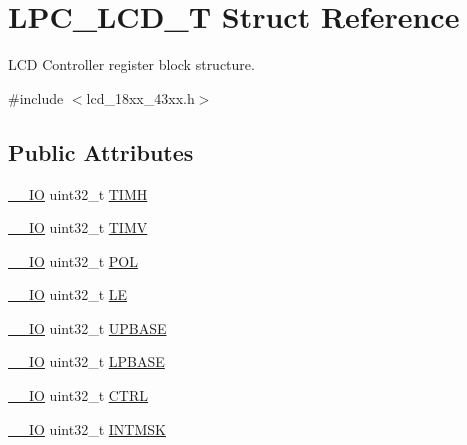\hypertarget{struct_l_p_c___l_c_d___t}{}\section{L\+P\+C\+\_\+\+L\+C\+D\+\_\+T Struct Reference}
\label{struct_l_p_c___l_c_d___t}


L\+CD Controller register block structure.  




{\ttfamily \#include $<$lcd\+\_\+18xx\+\_\+43xx.\+h$>$}

\subsection*{Public Attributes}
\begin{DoxyCompactItemize}
\item 
\hyperlink{core__sc300_8h_aec43007d9998a0a0e01faede4133d6be}{\+\_\+\+\_\+\+IO} uint32\+\_\+t \hyperlink{struct_l_p_c___l_c_d___t_a194e31abcb5374333f7e8346a5a7a3da}{T\+I\+MH}
\item 
\hyperlink{core__sc300_8h_aec43007d9998a0a0e01faede4133d6be}{\+\_\+\+\_\+\+IO} uint32\+\_\+t \hyperlink{struct_l_p_c___l_c_d___t_a01422d09a1ceb2784cdddd12c2b78cfc}{T\+I\+MV}
\item 
\hyperlink{core__sc300_8h_aec43007d9998a0a0e01faede4133d6be}{\+\_\+\+\_\+\+IO} uint32\+\_\+t \hyperlink{struct_l_p_c___l_c_d___t_a8674d4394f14a657cbc37e8cbea49c1d}{P\+OL}
\item 
\hyperlink{core__sc300_8h_aec43007d9998a0a0e01faede4133d6be}{\+\_\+\+\_\+\+IO} uint32\+\_\+t \hyperlink{struct_l_p_c___l_c_d___t_a5aac26c848401f1f369d7bf65c428036}{LE}
\item 
\hyperlink{core__sc300_8h_aec43007d9998a0a0e01faede4133d6be}{\+\_\+\+\_\+\+IO} uint32\+\_\+t \hyperlink{struct_l_p_c___l_c_d___t_a4df506e185ae165500576e5aeca11df3}{U\+P\+B\+A\+SE}
\item 
\hyperlink{core__sc300_8h_aec43007d9998a0a0e01faede4133d6be}{\+\_\+\+\_\+\+IO} uint32\+\_\+t \hyperlink{struct_l_p_c___l_c_d___t_ac954f35c70357ceaa2642b359858852d}{L\+P\+B\+A\+SE}
\item 
\hyperlink{core__sc300_8h_aec43007d9998a0a0e01faede4133d6be}{\+\_\+\+\_\+\+IO} uint32\+\_\+t \hyperlink{struct_l_p_c___l_c_d___t_a885b3bb8c088f0036bb6a96b4456d36a}{C\+T\+RL}
\item 
\hyperlink{core__sc300_8h_aec43007d9998a0a0e01faede4133d6be}{\+\_\+\+\_\+\+IO} uint32\+\_\+t \hyperlink{struct_l_p_c___l_c_d___t_a6d3240d9683ac3f5094e224937a841f1}{I\+N\+T\+M\+SK}

\end{DoxyCompactItemize}
